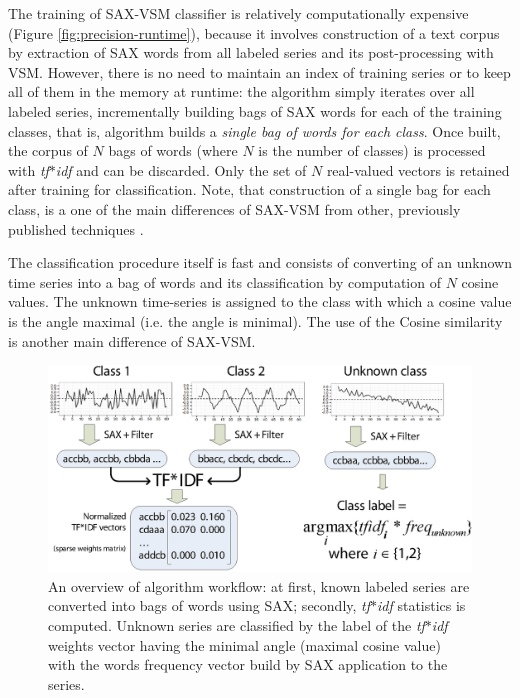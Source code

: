 \documentclass{llncs}
\begin{document}
The training of SAX-VSM classifier is relatively computationally expensive (Figure
\ref{fig:precision-runtime}), because it involves construction of a text corpus by extraction 
of SAX words from all labeled series and its post-processing with VSM. However, there is no need 
to maintain an index of training series or to keep all of them in the memory at runtime:
the algorithm simply iterates over all labeled series, incrementally building bags of SAX words for
each of the training classes, that is, algorithm builds a \textit{single bag of words for each
class}. Once built, the corpus of $N$ bags of words (where $N$ is the number of classes) is
processed with \textit{tf$\ast$idf} and can be discarded. Only the set of $N$ real-valued
vectors is retained after training for classification. Note, that construction of a single bag for
each class, is a one of the main differences of SAX-VSM from other, previously published 
techniques \cite{bag_patterns}.

The classification procedure itself is fast and consists of converting of an unknown time series
into a bag of words and its classification by computation of $N$ cosine values. The unknown 
time-series is assigned to the class with which a cosine value is the angle maximal (i.e. the
angle is minimal). The use of the Cosine similarity is another main difference of SAX-VSM.

\begin{figure}[H]
   \centering
   \includegraphics[width=120mm]{figures/overview.eps}
   \caption{An overview of algorithm workflow: at first, known labeled series are converted into
bags of words using SAX; secondly, \textit{tf$\ast$idf} statistics is computed. Unknown series are
classified by the label of the \textit{tf$\ast$idf} weights vector having the minimal angle (maximal
cosine value) with the words frequency vector build by SAX application to the series.}
   \label{fig:overview}
\end{figure}
\end{document}

